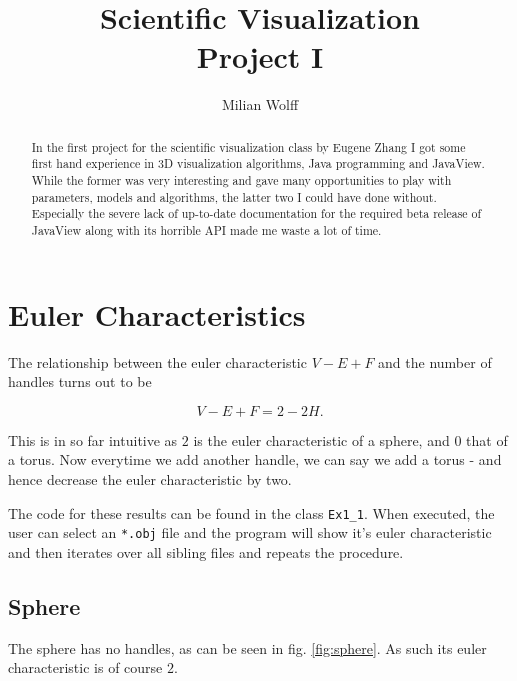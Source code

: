 \documentclass[a4paper,10pt,notitlepage]{scrreprt}
\title{Scientific Visualization\\Project I}
\author{Milian Wolff}
\begin{document}
\maketitle

\begin{abstract}
In the first project for the scientific visualization class by Eugene Zhang I
got some first hand experience in 3D visualization algorithms, Java programming
and JavaView. While the former was very interesting and gave many opportunities
to play with parameters, models and algorithms, the latter two I could have
done without. Especially the severe lack of up-to-date documentation for the
required beta release of JavaView along with its horrible API made me waste a
lot of time.
\end{abstract}

\begingroup
\let\clearpage\relax

\tableofcontents
\endgroup

\chapter{Euler Characteristics}

The relationship between the euler characteristic $V-E+F$ and the number of
handles turns out to be

\begin{equation}
 V-E+F = 2-2H .
 \label{eq:handle-euler}
\end{equation}

This is in so far intuitive as $2$ is the euler characteristic of a sphere, and
$0$ that of a torus. Now everytime we add another handle, we can say we add a
torus - and hence decrease the euler characteristic by two.

The code for these results can be found in the class \texttt{Ex1\_1}. When
executed, the user can select an \texttt{*.obj} file and the program will
show it's euler characteristic and then iterates over all sibling files and
repeats the procedure.

\section{Sphere}

The sphere has no handles, as can be seen in fig. \ref{fig:sphere}. As such its
euler characteristic is of course $2$.
\end{document}
